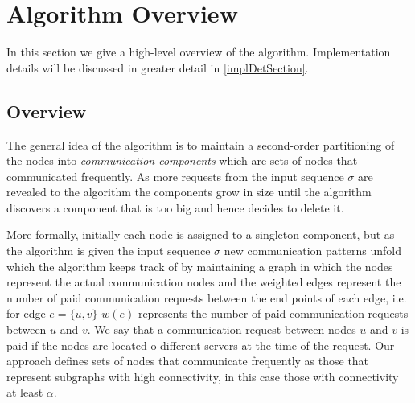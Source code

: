 \documentclass[xcolor=dvipsnames, tikz, 12pt]{article}
\newcommand{\nl}{\newline}
\theoremstyle{definition}
\begin{document}
	
	
	\section{Algorithm Overview}
	In this section we give a high-level overview of the algorithm. Implementation details will be discussed in greater detail in \cref{implDetSection}.
	
	\subsection{Overview}
	The general idea of the algorithm is to maintain a second-order partitioning of the nodes into \textit{communication components} which are sets of nodes that communicated frequently. As more requests from the input sequence $\sigma$ are revealed to the algorithm the components grow in size until the algorithm discovers a component that is too big and hence decides to delete it.\nl
	
	More formally, initially each node is assigned to a singleton component, but as the algorithm is given the input sequence $\sigma$ new communication patterns unfold which the algorithm keeps track of by maintaining a graph in which the nodes represent the actual communication nodes and the weighted edges represent the number of paid communication requests between the end points of each edge, i.e. for edge $e=\{u,v\}$ $w(e)$ represents the number of paid communication requests between $u$ and $v$. We say that a communication request between nodes $u$ and $v$ is paid if the nodes are located o different servers at the time of the request.\nl
	Our approach defines sets of nodes that communicate frequently as those that represent subgraphs with high connectivity, in this case those with connectivity at least $\alpha$.
	
\end{document}
